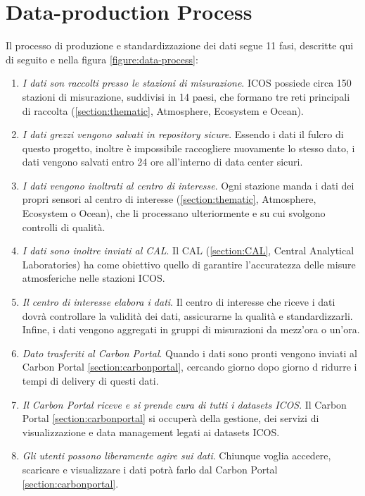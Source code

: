 \section{Data-production Process}
Il processo di produzione e standardizzazione dei dati segue 11 fasi, descritte qui di seguito e nella figura \ref{figure:data-process}:
\begin{enumerate}
    \item \textit{I dati son raccolti presso le stazioni di misurazione}.
    ICOS possiede circa 150 stazioni di misurazione, suddivisi in 14 paesi,
    che formano tre reti principali di raccolta (\ref{section:thematic}, Atmosphere, Ecosystem e Ocean).
    \item \textit{I dati grezzi vengono salvati in repository sicure}.
    Essendo i dati il fulcro di questo progetto, inoltre è impossibile raccogliere nuovamente
    lo stesso dato, i dati vengono salvati entro 24 ore all'interno di
    data center sicuri.
    \item \textit{I dati vengono inoltrati al centro di interesse}. Ogni stazione manda i dati dei propri sensori al centro di interesse
    (\ref{section:thematic}, Atmosphere, Ecosystem o Ocean), che li processano ulteriormente e su cui svolgono controlli di qualità.
    \item \textit{I dati sono inoltre inviati al CAL}. Il CAL (\ref{section:CAL}, Central Analytical Laboratories)
     ha come obiettivo quello di garantire
    l'accuratezza delle misure atmosferiche nelle stazioni ICOS.
    \item \textit{Il centro di interesse elabora i dati}. Il centro di interesse che riceve i dati dovrà controllare la validità dei dati, assicurarne la qualità e
    standardizzarli. Infine, i dati vengono aggregati in gruppi di misurazioni da mezz'ora o un'ora.
    \item \textit{Dato trasferiti al Carbon Portal}. Quando i dati sono pronti vengono inviati al Carbon Portal \ref{section:carbonportal}, 
    cercando giorno dopo giorno d ridurre i tempi di delivery di questi dati.
    \item \textit{Il Carbon Portal riceve e si prende cura di tutti i datasets ICOS}. Il Carbon Portal \ref{section:carbonportal} si occuperà della gestione, dei servizi di visualizzazione e data management legati ai datasets ICOS.
    \item \textit{Gli utenti possono liberamente agire sui dati}. Chiunque voglia accedere, scaricare e visualizzare i dati potrà farlo dal Carbon Portal \ref{section:carbonportal}.

\end{enumerate}
